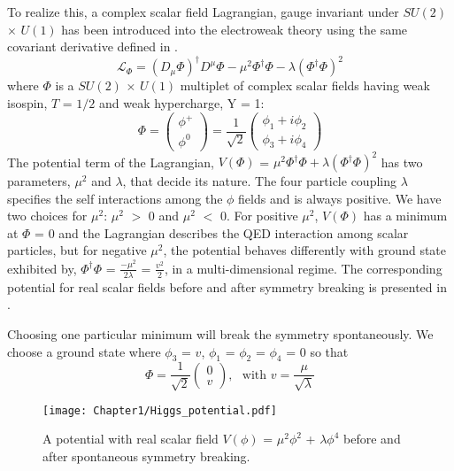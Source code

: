 To realize this, a complex scalar field Lagrangian, gauge invariant under $SU(2)$ $\times$ $U(1)$ has been introduced into the electroweak theory
using the same covariant derivative defined in
\eqn{\ref{eg:EWKdelToD}}.
\begin{equation}
\mathcal{L}_{\Phi} = {(D_{\mu}\Phi)}^{\dag}D^{\mu}\Phi - \mu^{2}\Phi^{\dag}\Phi - \lambda{(\Phi^{\dag}\Phi)}^{2}
\label{eq:HiggsLag}
\end{equation}
where $\Phi$ is a $SU(2)$ $\times$ $U(1)$ multiplet of complex scalar fields having weak isospin, $T$ = $1/2$ and weak hypercharge, Y = 1:
\begin{equation}
\Phi = \left(\begin{array}{c} \phi^{+} \\ \phi^{0} \end{array}\right) = \frac{1}{\sqrt{2}} 
 \left(\begin{array}{c} \phi_{1} + i\phi_{2} \\ \phi_{3} + i\phi_{4}  \end{array}\right)
\end{equation}
The potential term of the Lagrangian, $V(\Phi)$ = $\mu^{2}\Phi^{\dag}\Phi + \lambda{(\Phi^{\dag}\Phi)}^{2}$ has two parameters, $\mu^{2}$ and $\lambda$, that
decide its nature. The four particle coupling $\lambda$ specifies the self interactions among the $\phi$ fields and is always positive. We have two
choices for $\mu^{2}$: $\mu^{2}$ $>$ $0$ and $\mu^{2}$ $<$ $0$. For positive $\mu^{2}$, $V(\Phi)$ has a minimum at $\Phi$ = $0$ and the Lagrangian describes
the QED interaction among scalar particles, but for negative $\mu^{2}$,
the potential behaves differently with ground state exhibited by, $\Phi^{\dag}\Phi$ = $\frac{-\mu^{2}}{2\lambda}$ = $\frac{v^{2}}{2}$, in a multi-dimensional regime.
The corresponding potential for real scalar fields before and after symmetry breaking is presented in \fig{\ref{fig:Higgs_potential}}.

Choosing one particular minimum will break the symmetry spontaneously. We choose a ground state where $\phi_{3}$ = $v$, $\phi_{1}$ = $\phi_{2}$ = $\phi_{4}$ = 0 so that
\begin{equation}
\Phi =\frac{1}{\sqrt{2}}\left(\begin{array}{c} 0 \\ v \end{array}\right), \:\:\: \textrm{with } v =\frac{\mu}{\sqrt{\lambda}}
\end{equation}

\begin{figure}[htpb]
\centerline{\texttt{[image: Chapter1/Higgs\_potential.pdf]}}
\caption{A potential with real scalar field $V(\phi)$ = $\mu^{2}\phi^{2}$ + $\lambda{\phi^{4}}$ before and after spontaneous symmetry breaking.}
\label{fig:Higgs_potential}
\end{figure}
\vspace{0.1in}

